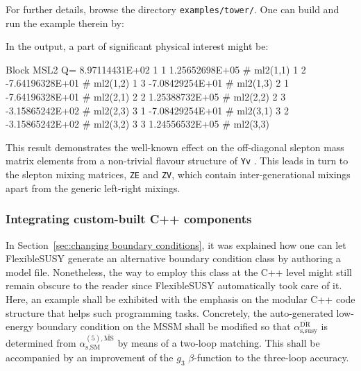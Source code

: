 \documentclass[final,3p,11pt,pdflatex]{elsarticle}
\makeatletter
\newcommand{\fs}{FlexibleSUSY\@\xspace}
\newcommand{\code}[1]{\lstinline|#1|}  %
\newcommand{\textoverline}[1]{$\overline{\mbox{#1}}$}
\newcommand{\DRbar}{\textoverline{DR}\xspace}
\newcommand{\MSbar}{\textoverline{MS}\xspace}
\newcommand{\secref}[1]{Section~\ref{#1}}
\makeatother
\begin{document}
For further details, browse the directory \code{examples/tower/}.
One can build and run the example therein by:
In the output,
a part of significant physical interest might be:
\begin{numlstlisting}
Block MSL2 Q=   8.97114431E+02
  1  1     1.25652698E+05   # ml2(1,1)
  1  2    -7.64196328E+01   # ml2(1,2)
  1  3    -7.08429254E+01   # ml2(1,3)
  2  1    -7.64196328E+01   # ml2(2,1)
  2  2     1.25388732E+05   # ml2(2,2)
  2  3    -3.15865242E+02   # ml2(2,3)
  3  1    -7.08429254E+01   # ml2(3,1)
  3  2    -3.15865242E+02   # ml2(3,2)
  3  3     1.24556532E+05   # ml2(3,3)
\end{numlstlisting}
This result demonstrates the well-known effect on
the off-diagonal slepton mass matrix elements
from a non-trivial flavour structure of \code{Yv}
\cite{Borzumati:1986qx}.
This leads in turn to the slepton mixing
matrices, \code{ZE} and \code{ZV},
which contain inter-generational mixings apart from the
generic left-right mixings.

\subsubsection{Integrating custom-built C++ components}
\label{sec:integrating-custom-built}

In \secref{sec:changing boundary conditions},
it was explained how one can let \fs generate
an alternative boundary condition class
by authoring a model file.
Nonetheless, the way to employ this class at the C++ level
might still remain obscure to the reader
since \fs automatically took care of it.
Here, an example shall be exhibited
with the emphasis on the modular C++ code structure
that helps such programming tasks.
Concretely,
the auto-generated low-energy boundary condition on the MSSM
shall be modified so that
$\alpha_{,}^{\text{\DRbar}}$
is determined from
$\alpha_{,}^{(5),\text{\MSbar}}$
by means of a two-loop matching.
This shall be accompanied by an improvement
of the $g_3$ $\beta$-function to the three-loop accuracy.
\end{document}
